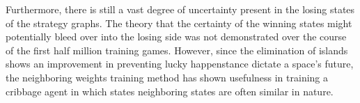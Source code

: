 Furthermore,
there is still a vast degree of uncertainty present in the losing states of
the strategy graphs.
%
The theory that the certainty of the winning states might potentially
bleed over into the losing side was not demonstrated over the course of
the first half million training games.
%
However,
since the elimination of islands shows an improvement in
preventing lucky happenstance dictate a space's future,
the neighboring weights training method has shown usefulness in training a
cribbage agent in which states neighboring states are often similar in nature.

